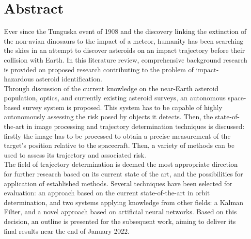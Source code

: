 \chapter{Abstract}
\label{ch:abstract}

Ever since the Tunguska event of 1908 and the discovery linking the extinction of the non-avian dinosaurs to the impact of a meteor, humanity has been searching the skies in an attempt to discover asteroids on an impact trajectory before their collision with Earth. In this literature review, comprehensive background research is provided on proposed research contributing to the problem of impact-hazardous asteroid identification. \\

Through discussion of the current knowledge on the near-Earth asteroid population, optics, and currently existing asteroid surveys, an autonomous space-based survey system is proposed. This system has to be capable of highly autonomously assessing the risk posed by objects it detects. Then, the state-of-the-art in image processing and trajectory determination techniques is discussed: firstly the image has to be processed to obtain a precise measurement of the target's position relative to the spacecraft. Then, a variety of methods can be used to assess its trajectory and associated risk.\\

The field of trajectory determination is deemed the most appropriate direction for further research based on its current state of the art, and the possibilities for application of established methods. Several techniques have been selected for evaluation: an approach based on the current state-of-the-art in orbit determination, and two systems applying knowledge from other fields: a Kalman Filter, and a novel approach based on artificial neural networks. Based on this decision, an outline is presented for the subsequent work, aiming to deliver its final results near the end of January 2022.